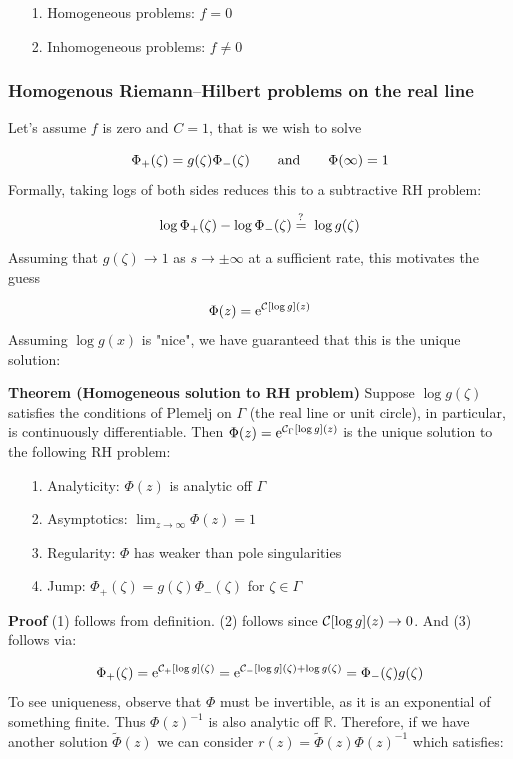 \documentclass[12pt,a4paper]{article}
\def\qqand{\qquad\hbox{and}\qquad}
\def\E{ {\rm e} }
\def\R{ {\mathbb R} }
\def\CC{ {\cal C} }
\def\endash{–}
\def\questionequals{= \!\!\!\!\!\!{\scriptstyle ? \atop }\,\,\,}
\begin{document}
\begin{itemize}
\item[1. ] Homogeneous problems: $f = 0$


\item[2. ] Inhomogeneous problems: $f \neq 0$

\end{itemize}
\subsubsection{Homogenous Riemann\ensuremath{\endash}Hilbert problems on the real line}
Let's assume $f$ is zero and $C = 1$, that is we wish to solve

\[
\Phi_+(\zeta) = g(\zeta) \Phi_-(\zeta) \qqand \Phi(\infty) = 1
\]
Formally, taking logs of both sides reduces this to a subtractive RH problem:

\[
\log \Phi_+(\zeta) - \log\Phi_-(\zeta) \questionequals \log g(\zeta)
\]
Assuming that $g(\zeta) \rightarrow 1$ as $s \rightarrow \pm \infty$ at a sufficient rate, this motivates the guess

\[
\Phi(z) = \E^{\CC[\log g](z)}
\]
Assuming $\log g(x)$ is "nice", we have guaranteed that this is the unique solution:

\textbf{Theorem (Homogeneous solution to RH problem)} Suppose $\log g(\zeta)$ satisfies the conditions of Plemelj on $\Gamma$ (the real line or unit circle), in particular, is continuously differentiable. Then $\Phi(z) = \E^{\CC_\Gamma[\log g](z)}$ is the unique solution to the following RH problem:

\begin{itemize}
\item[1. ] Analyticity: $\Phi(z)$ is analytic off $\Gamma$


\item[2. ] Asymptotics: $\lim_{z\rightarrow \infty}\Phi(z) = 1$ 


\item[3. ] Regularity: $\Phi$ has weaker than pole singularities


\item[4. ] Jump: $\Phi_+(\zeta) = g(\zeta) \Phi_-(\zeta)$ for $\zeta \in \Gamma$

\end{itemize}
\textbf{Proof} (1) follows from definition. (2) follows since $\CC[\log g](z) \rightarrow 0$. And (3) follows via:

\[
\Phi_+(\zeta) = \E^{\CC_+[\log g](\zeta)} = \E^{\CC_-[\log g](\zeta) + \log g(\zeta)} = \Phi_-(\zeta) g(\zeta)
\]
To see uniqueness, observe that $\Phi$ must be invertible, as it is an exponential of something finite.  Thus $\Phi(z)^{-1}$ is also analytic off $\R$. Therefore, if we have another solution $\tilde \Phi(z)$ we can consider $r(z) = \tilde\Phi(z) \Phi(z)^{-1}$ which satisfies:
\end{document}
